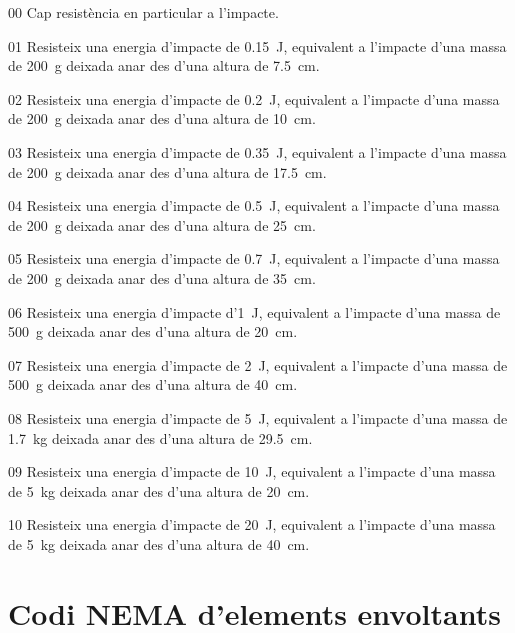 \begin{list}{}
   {\setlength{\labelwidth}{10mm} \setlength{\leftmargin}{15mm} \setlength{\labelsep}{5mm}}
   \item[00] Cap resistència en particular a l'impacte.
   \item[01] Resisteix una energia d'impacte de \qty{0,15}{J}, equivalent a l'impacte d'una massa de \qty{200}{g} deixada anar des d'una altura de \qty{7,5}{cm}.
   \item[02] Resisteix una energia d'impacte de \qty{0,2}{J}, equivalent a l'impacte d'una massa de \qty{200}{g} deixada anar des d'una altura de \qty{10}{cm}.
   \item[03] Resisteix una energia d'impacte de \qty{0,35}{J}, equivalent a l'impacte d'una massa de \qty{200}{g} deixada anar des d'una altura de \qty{17,5}{cm}.
   \item[04] Resisteix una energia d'impacte de \qty{0,5}{J}, equivalent a l'impacte d'una massa de \qty{200}{g} deixada anar des d'una altura de \qty{25}{cm}.
   \item[05] Resisteix una energia d'impacte de \qty{0,7}{J}, equivalent a l'impacte d'una massa de \qty{200}{g} deixada anar des d'una altura de \qty{35}{cm}.
   \item[06]Resisteix una energia d'impacte d'\qty{1}{J}, equivalent a l'impacte d'una massa de \qty{500}{g} deixada anar des d'una altura de \qty{20}{cm}.
   \item[07]Resisteix una energia d'impacte de \qty{2}{J}, equivalent a l'impacte d'una massa de \qty{500}{g} deixada anar des d'una altura de \qty{40}{cm}.
   \item[08]Resisteix una energia d'impacte de \qty{5}{J}, equivalent a l'impacte d'una massa de \qty{1,7}{kg} deixada anar des d'una altura de \qty{29,5}{cm}.
   \item[09]Resisteix una energia d'impacte de \qty{10}{J}, equivalent a l'impacte d'una massa de \qty{5}{kg} deixada anar des d'una altura de \qty{20}{cm}.
   \item[10]Resisteix una energia d'impacte de \qty{20}{J}, equivalent a l'impacte d'una massa de \qty{5}{kg} deixada anar des d'una altura de \qty{40}{cm}.
\end{list}



\section{Codi NEMA d'elements envoltants}
 

